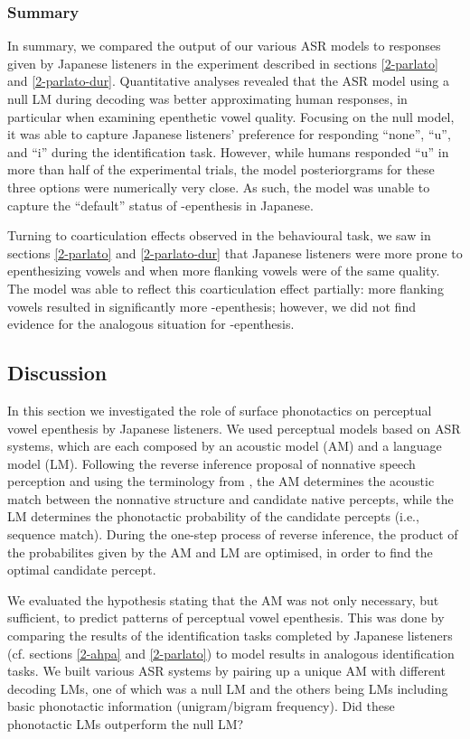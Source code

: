 {\subsubsection{Summary}
In summary, we compared the output of our various ASR models to responses given by Japanese listeners in the experiment described in sections \ref{2-parlato} and \ref{2-parlato-dur}. Quantitative analyses revealed that the ASR model using a null LM during decoding was better approximating human responses, in particular when examining epenthetic vowel quality. Focusing on the null model, it was able to capture Japanese listeners' preference for responding ``none'', ``u'', and ``i'' during the identification task. However, while humans responded ``u'' in more than half of the experimental trials, the model posteriorgrams for these three options were numerically very close. As such, the model was unable to capture the ``default'' status of -epenthesis in Japanese.

Turning to coarticulation effects observed in the behavioural task, we saw in sections \ref{2-parlato} and \ref{2-parlato-dur} that Japanese listeners were more prone to epenthesizing vowels  and  when more flanking vowels were of the same quality. The model was able to reflect this coarticulation effect partially: more  flanking vowels resulted in significantly more -epenthesis; however, we did not find evidence for the analogous situation for -epenthesis.  

\subsection{Discussion}
In this section we investigated the role of surface phonotactics on perceptual vowel epenthesis by Japanese listeners. We used perceptual models based on ASR systems, which are each composed by an acoustic model (AM) and a language model (LM). Following the reverse inference proposal of nonnative speech perception \cite{wilson2014} and using the terminology from \cite{dupoux2011}, the AM determines the acoustic match between the nonnative structure and candidate native percepts, while the LM determines the phonotactic probability of the candidate percepts (i.e., sequence match). During the one-step process of reverse inference, the product of the probabilites given by the AM and LM are optimised, in order to find the optimal candidate percept.

We evaluated the hypothesis stating that the AM was not only necessary, but sufficient, to predict patterns of perceptual vowel epenthesis. 
This was done by comparing the results of the identification tasks completed by Japanese listeners (cf. sections \ref{2-ahpa} and \ref{2-parlato}) to model results in analogous identification tasks. We built various ASR systems by pairing up a unique AM with different decoding LMs, one of which was a null LM and the others being LMs including basic phonotactic information (unigram/bigram frequency). Did these phonotactic LMs outperform the null LM?

}
